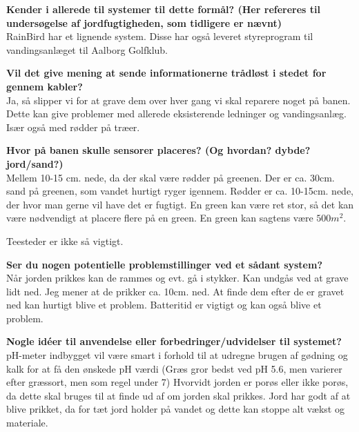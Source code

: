 \textbf{Kender i allerede til systemer til dette formål? (Her refereres til undersøgelse af jordfugtigheden, som tidligere er nævnt)}\\
RainBird har et lignende system. Disse har også leveret styreprogram til vandingsanlæget til Aalborg Golfklub.

\textbf{Vil det give mening at sende informationerne trådløst i stedet for gennem kabler?}\\
Ja, så slipper vi for at grave dem over hver gang vi skal reparere noget på banen. Dette kan give problemer med allerede eksisterende ledninger og vandingsanlæg. Især også med rødder på træer.

\textbf{Hvor på banen skulle sensorer placeres? (Og hvordan? dybde? jord/sand?)}\\
Mellem 10-15 cm. nede, da der skal være rødder på greenen. Der er ca. 30cm. sand på greenen, som vandet hurtigt ryger igennem. Rødder er ca. 10-15cm. nede, der hvor man gerne vil have det er fugtigt.
En green kan være ret stor, så det kan være nødvendigt at placere flere på en green. En green kan sagtens være $500m^2$.

Teesteder er ikke så vigtigt.

\textbf{Ser du nogen potentielle problemstillinger ved et sådant system?}\\
Når jorden prikkes kan de rammes og evt. gå i stykker. Kan undgås ved at grave lidt ned. Jeg mener at de prikker ca. 10cm. ned. 
At finde dem efter de er gravet ned kan hurtigt blive et problem. Batteritid er vigtigt og kan også blive et problem.

\textbf{Nogle idéer til anvendelse eller forbedringer/udvidelser til systemet?}\\
pH-meter indbygget vil være smart i forhold til at udregne brugen af gødning og kalk for at få den ønskede pH værdi (Græs gror bedst ved pH 5.6, men varierer efter græssort, men som regel under 7)
Hvorvidt jorden er porøs eller ikke porøs, da dette skal bruges til at finde ud af om jorden skal prikkes.
Jord har godt af at blive prikket, da for tæt jord holder på vandet og dette kan stoppe alt vækst og materiale.
